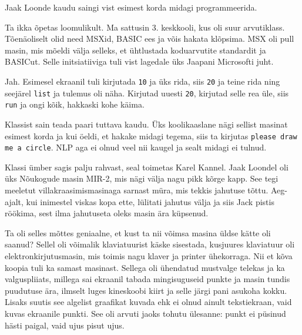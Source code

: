Jaak Loonde kaudu saingi vist esimest korda midagi 
programmeerida. 


Ta ikka õpetas loomulikult. Ma sattusin 3. 
keskkooli, kus oli suur arvutiklass. Tõenäoliselt 
olid need MSXid, BASIC ees ja võis hakata klõpsima. 
MSX oli pull masin, mis mõeldi välja selleks, et 
ühtlustada koduarvutite standardit ja BASICut. Selle 
initsiatiiviga tuli vist lagedale üks Jaapani Microsofti juht.


Jah. Esimesel ekraanil tuli kirjutada \verb|10| ja üks rida, siis \verb|20| ja 
teine 
rida ning seejärel \verb|list| ja tulemus oli näha. Kirjutad uuesti 
\verb|20|, kirjutad selle rea üle, siis \verb|run| ja ongi kõik, 
hakkaski kohe käima. 

Klassist sain teada paari tuttava kaudu. Üks koolikaaslane nägi sellist
masinat esimest korda ja kui öeldi, et hakake midagi tegema, siis ta 
kirjutas \verb|please draw me a circle|. NLP aga ei olnud veel nii 
kaugel 
ja sealt midagi ei tulnud.

Klassi ümber sagis palju rahvast, seal toimetas Karel Kannel. 
Jaak Loondel oli üks Nõukogude masin 
MIR-2, mis nägi välja nagu 
pikk kõrge kapp. See tegi meeletut villakraasimismasinaga sarnast 
müra, mis tekkis jahutuse tõttu. Aeg-ajalt, kui inimestel 
viskas kopa ette, lülitati jahutus välja ja siis 
Jack pistis
röökima, sest ilma jahutuseta oleks masin ära küpsenud. 

Ta oli selles mõttes geniaalne, et kust ta nii võimsa masina üldse kätte oli 
saanud? Sellel oli võimalik klaviatuurist käske 
sisestada, kusjuures klaviatuur oli elektronkirjutusmasin, mis toimis
nagu klaver ja printer ühekorraga. Nii et kõva koopia tuli ka samast 
masinast. Sellega oli ühendatud mustvalge telekas ja ka 
valguspliiats, millega sai ekraanil tabada mingisuguseid punkte ja 
masin tundis puudutuse ära, ilmselt luges kineskoobi kiirt ja selle järgi 
pani asukoha kokku. Lisaks suutis see algelist graafikat 
kuvada ehk ei olnud ainult tekstiekraan, vaid kuvas ekraanile 
punkti. See oli arvuti jaoks tohutu ülesanne: punkt ei 
püsinud hästi paigal, vaid ujus pisut ujus. 

